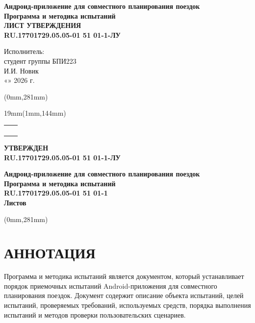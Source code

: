 \documentclass[12pt,a4paper]{article}
\newcommand{\doccode}{RU.17701729.05.05-01 51 01-1}
\newcommand{\doccodeapproval}{RU.17701729.05.05-01 51 01-1-ЛУ}
\newcommand{\doctitle}{Андроид-приложение для совместного планирования поездок}
\newcommand{\doctype}{Программа и методика испытаний}
\newcommand{\leftapprovalstamp}[1]{%
  \begingroup
  \renewcommand{\arraystretch}{1.0}
  \setlength{\tabcolsep}{0pt}
  \footnotesize
  \begin{tabular}{|>{\centering\arraybackslash}m{0.65cm}|>{\centering\arraybackslash}m{1.05cm}|}
    \hline
    \rotatebox{90}{Подп. и дата} & \rule{0pt}{1.10cm}\\
    \hline
    \rotatebox{90}{Инв. № дубл.} & \rule{0pt}{1.00cm}\\
    \hline
    \rotatebox{90}{Взам. инв. №} & \rule{0pt}{1.00cm}\\
    \hline
    \rotatebox{90}{Подп. и дата} & \rule{0pt}{1.10cm}\\
    \hline
    \rotatebox{90}{Инв. № подл.} &
    \rotatebox{90}{\scalebox{0.70}{#1}}\rule{0pt}{0.95cm}\\
    \hline
  \end{tabular}
  \endgroup
}
\newcommand{\placestamp}[2]{%
  \begin{textblock*}{19mm}(1mm,#2)
    \leftapprovalstamp{#1}
  \end{textblock*}
}
\begin{document}
\vspace{0.75cm}
\begin{center}
  {\large\textbf{\doctitle}}\\[0.22cm]
  {\large\textbf{\doctype}}\\[0.18cm]
  {\large\textbf{ЛИСТ УТВЕРЖДЕНИЯ}}\\[0.18cm]
  {\large\textbf{\doccodeapproval}}
\end{center}

\vspace{1.15cm}
\begin{flushright}
  Исполнитель:\\[0.25cm]
  студент группы БПИ223\\[0.35cm]
  \underline{\hspace{2.5cm}} И.И. Новик\\[0.25cm]
  «\underline{\hspace{0.9cm}}» \underline{\hspace{2.8cm}} 2026 г.
\end{flushright}

\begin{textblock*}{\paperwidth}(0mm,281mm)
\end{textblock*}
\newpage

\thispagestyle{empty}
\placestamp{\doccodeapproval}{144mm}
\vspace*{-0.6cm}

\begin{flushleft}
  \textbf{УТВЕРЖДЕН}\\[0.2cm]
  \textbf{\doccodeapproval}
\end{flushleft}

\vspace{1.4cm}
\begin{center}
  {\large\textbf{\doctitle}}\\[0.22cm]
  {\Large\textbf{\doctype}}\\[0.22cm]
  {\Large\textbf{\doccode}}\\[0.2cm]
  {\Large\textbf{Листов \pageref{lastnumberedpage}}}
\end{center}

\begin{textblock*}{\paperwidth}(0mm,281mm)
\end{textblock*}

\clearpage
\hypersetup{pageanchor=true}
\setcounter{page}{2}
\pagestyle{pmistyle}

\section*{АННОТАЦИЯ}
Программа и методика испытаний является документом, который устанавливает порядок приемочных испытаний Android-приложения для совместного планирования поездок.
Документ содержит описание объекта испытаний, целей испытаний, проверяемых требований, используемых средств, порядка выполнения испытаний и методов проверки пользовательских сценариев.
\end{document}
